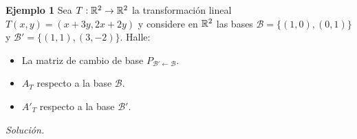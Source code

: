 \begin{frame}%
	
	
	\begin{ej}{\textbf{Ejemplo 1}}
		\justifying
		Sea $T:\mathbb{R}^2\to \mathbb{R}^2$ la transformación lineal $T(x,y)=(x+3y,2x+2y)$ y considere en $\mathbb{R}^2$ las bases
		$\mathcal{B} = \{(1,0), (0,1)\}$ y $\mathcal{B}' = \{(1,1), (3,-2)\}$. Halle:
		
			\begin{itemize}
				\item[\labelname{$a$}] La matriz de cambio de base $P_{\mathcal{B}' \leftarrow\mathcal{B}}$.
				\item[\labelname{$b$}] $A_T$ respecto a la base $\mathcal{B}$. 
				\item[\labelname{$c$}] $A'_T$ respecto a la base $\mathcal{B}'$.
			\end{itemize}
	\end{ej}
	\textit{Solución.}
	
\end{frame}

